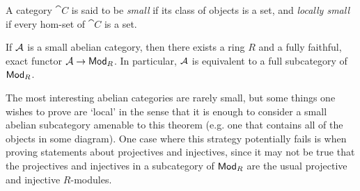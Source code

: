 \begin{definition}
  A category $\cat{C}$ is said to be \emph{small} if its class of
  objects is a set, and \emph{locally small} if every hom-set of
  $\cat{C}$ is a set.
\end{definition}

\begin{theorem}
  If $\mathcal{A}$ is a small abelian category, then there exists a
  ring $R$ and a fully faithful, exact functor $\mathcal{A} \to {\mathsf{Mod}}_{{R}}$.
  In particular, $\mathcal{A}$ is equivalent to a full subcategory of ${\mathsf{Mod}}_{{R}}$.
\end{theorem}

The most interesting abelian categories are rarely small, but some
things one wishes to prove are `local' in the sense that it is enough
to consider a small abelian subcategory amenable to this theorem
(e.g. one that contains all of the objects in some diagram).
One case where this strategy potentially fails is when proving
statements about projectives and injectives, since it may not be true
that the projectives and injectives in a subcategory of ${\mathsf{Mod}}_{{R}}$ are
the usual projective and injective $R$-modules.
